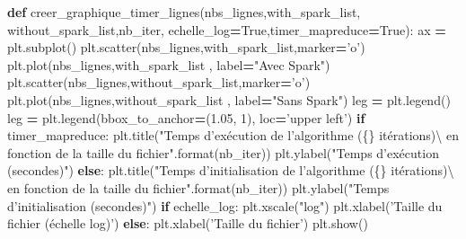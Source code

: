 \documentclass[10pt,a4paper]{article}
\newenvironment{Shaded}{\begin{snugshade}}{\end{snugshade}}
\newcommand{\BuiltInTok}[1]{#1}
\newcommand{\ControlFlowTok}[1]{\textcolor[rgb]{0.13,0.29,0.53}{\textbf{#1}}}
\newcommand{\DecValTok}[1]{\textcolor[rgb]{0.00,0.00,0.81}{#1}}
\newcommand{\FloatTok}[1]{\textcolor[rgb]{0.00,0.00,0.81}{#1}}
\newcommand{\KeywordTok}[1]{\textcolor[rgb]{0.13,0.29,0.53}{\textbf{#1}}}
\newcommand{\NormalTok}[1]{#1}
\newcommand{\OperatorTok}[1]{\textcolor[rgb]{0.81,0.36,0.00}{\textbf{#1}}}
\newcommand{\SpecialCharTok}[1]{\textcolor[rgb]{0.00,0.00,0.00}{#1}}
\newcommand{\StringTok}[1]{\textcolor[rgb]{0.31,0.60,0.02}{#1}}
\newcommand{\VariableTok}[1]{\textcolor[rgb]{0.00,0.00,0.00}{#1}}
\theoremstyle{break}
\begin{document}
\begin{Shaded}
\begin{Highlighting}[]
\KeywordTok{def}\NormalTok{ creer_graphique_timer_lignes(nbs_lignes,with_spark_list,}
\NormalTok{                                 without_spark_list,nb_iter,}
\NormalTok{                                echelle_log}\OperatorTok{=}\VariableTok{True}\NormalTok{,timer_mapreduce}\OperatorTok{=}\VariableTok{True}\NormalTok{):    }
\NormalTok{    ax }\OperatorTok{=}\NormalTok{ plt.subplot()}
\NormalTok{    plt.scatter(nbs_lignes,with_spark_list,marker}\OperatorTok{=}\StringTok{'o'}\NormalTok{)}
\NormalTok{    plt.plot(nbs_lignes,with_spark_list , label}\OperatorTok{=}\StringTok{"Avec Spark"}\NormalTok{)}
\NormalTok{    plt.scatter(nbs_lignes,without_spark_list,marker}\OperatorTok{=}\StringTok{'o'}\NormalTok{)}
\NormalTok{    plt.plot(nbs_lignes,without_spark_list , label}\OperatorTok{=}\StringTok{"Sans Spark"}\NormalTok{)}
\NormalTok{    leg }\OperatorTok{=}\NormalTok{ plt.legend()}
\NormalTok{    leg }\OperatorTok{=}\NormalTok{ plt.legend(bbox_to_anchor}\OperatorTok{=}\NormalTok{(}\FloatTok{1.05}\NormalTok{, }\DecValTok{1}\NormalTok{), loc}\OperatorTok{=}\StringTok{'upper left'}\NormalTok{)}
    \ControlFlowTok{if}\NormalTok{ timer_mapreduce:}
\NormalTok{        plt.title(}\StringTok{"Temps d'exécution de l'algorithme (}\SpecialCharTok{\{\}}\StringTok{ itérations)\textbackslash{}}
\StringTok{        en fonction de la taille du fichier"}\NormalTok{.}\BuiltInTok{format}\NormalTok{(nb_iter))}
\NormalTok{        plt.ylabel(}\StringTok{"Temps d'exécution (secondes)"}\NormalTok{)}
    \ControlFlowTok{else}\NormalTok{:}
\NormalTok{        plt.title(}\StringTok{"Temps d'initialisation de l'algorithme (}\SpecialCharTok{\{\}}\StringTok{ itérations)\textbackslash{}}
\StringTok{                  en fonction de la taille du fichier"}\NormalTok{.}\BuiltInTok{format}\NormalTok{(nb_iter))}
\NormalTok{        plt.ylabel(}\StringTok{"Temps d'initialisation (secondes)"}\NormalTok{)}
    \ControlFlowTok{if}\NormalTok{ echelle_log:}
\NormalTok{        plt.xscale(}\StringTok{"log"}\NormalTok{)}
\NormalTok{        plt.xlabel(}\StringTok{'Taille du fichier (échelle log)'}\NormalTok{)}
    \ControlFlowTok{else}\NormalTok{:}
\NormalTok{        plt.xlabel(}\StringTok{'Taille du fichier'}\NormalTok{)}
\NormalTok{    plt.show()}
\end{Highlighting}
\end{Shaded}
\end{document}
